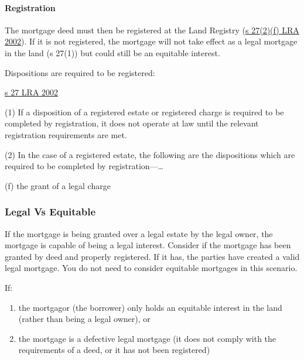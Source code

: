 \documentclass[
]{article}
\providecommand{\tightlist}{%
  \setlength{\itemsep}{0pt}\setlength{\parskip}{0pt}}
\newenvironment{env-9843ce55-0506-497d-95ba-03a690b05b3c}
{
    \savenotes\tcolorbox[blanker,breakable,left=5pt,borderline west={2pt}{-4pt}{green}]
}
{
    \endtcolorbox\spewnotes
}
\begin{document}
\hypertarget{registration}{%
\paragraph{Registration}\label{registration}}

The mortgage deed must then be registered at the Land Registry
(\href{https://www.legislation.gov.uk/ukpga/2002/9/section/27}{s
27(2)(f) LRA 2002}). If it is not registered, the mortgage will not take
effect as a legal mortgage in the land (s 27(1)) but could still be an
equitable interest.

Dispositions are required to be registered:

\begin{env-9843ce55-0506-497d-95ba-03a690b05b3c}

\href{https://www.legislation.gov.uk/ukpga/2002/9/section/27}{s 27 LRA
2002}

(1) If a disposition of a registered estate or registered charge is
required to be completed by registration, it does not operate at law
until the relevant registration requirements are met.

(2) In the case of a registered estate, the following are the
dispositions which are required to be completed by
registration---\ldots{}

(f) the grant of a legal charge

\end{env-9843ce55-0506-497d-95ba-03a690b05b3c}

\hypertarget{legal-vs-equitable}{%
\subsubsection{Legal Vs Equitable}\label{legal-vs-equitable}}

If the mortgage is being granted over a legal estate by the legal owner,
the mortgage is capable of being a legal interest. Consider if the
mortgage has been granted by deed and properly registered. If it has,
the parties have created a valid legal mortgage. You do not need to
consider equitable mortgages in this scenario.

If:

\begin{enumerate}
\tightlist
\item
  the mortgagor (the borrower) only holds an equitable interest in the
  land (rather than being a legal owner), or
\item
  the mortgage is a defective legal mortgage (it does not comply with
  the requirements of a deed, or it has not been registered)
\end{enumerate}
\end{document}
